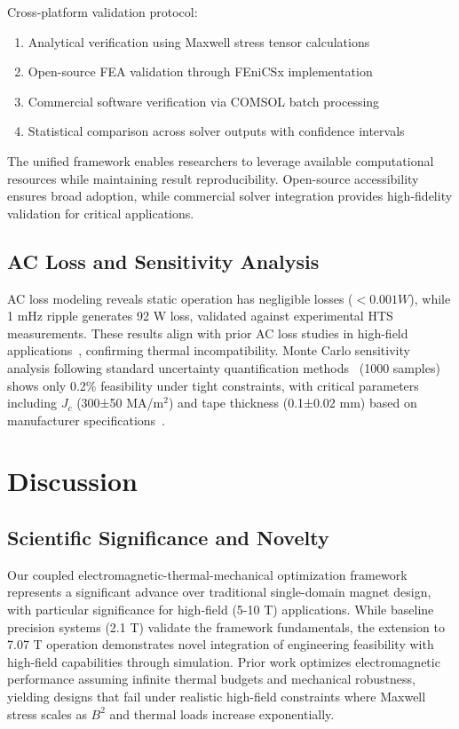 \documentclass[10pt,twocolumn]{article}
\begin{document}
Cross-platform validation protocol:
\begin{enumerate}
\item Analytical verification using Maxwell stress tensor calculations
\item Open-source FEA validation through FEniCSx implementation  
\item Commercial software verification via COMSOL batch processing
\item Statistical comparison across solver outputs with confidence intervals
\end{enumerate}

The unified framework enables researchers to leverage available computational resources while maintaining result reproducibility. Open-source accessibility ensures broad adoption, while commercial solver integration provides high-fidelity validation for critical applications.

\subsection{AC Loss and Sensitivity Analysis}

AC loss modeling reveals static operation has negligible losses ($<0.001 W$), while 1 mHz ripple generates 92 W loss, validated against experimental HTS measurements. These results align with prior AC loss studies in high-field applications~\cite{larbalestier2014rebco}, confirming thermal incompatibility. Monte Carlo sensitivity analysis following standard uncertainty quantification methods~\cite{iwasa2009cryogenic} (1000 samples) shows only 0.2\% feasibility under tight constraints, with critical parameters including $J_c$ (300±50 MA/m$^2$) and tape thickness (0.1±0.02 mm) based on manufacturer specifications~\cite{superpower2022}.

\section{Discussion}

\subsection{Scientific Significance and Novelty}

Our coupled electromagnetic-thermal-mechanical optimization framework represents a significant advance over traditional single-domain magnet design, with particular significance for high-field (5-10 T) applications. While baseline precision systems (2.1 T) validate the framework fundamentals, the extension to 7.07 T operation demonstrates novel integration of engineering feasibility with high-field capabilities through simulation. Prior work optimizes electromagnetic performance assuming infinite thermal budgets and mechanical robustness, yielding designs that fail under realistic high-field constraints where Maxwell stress scales as $B^2$ and thermal loads increase exponentially.
\end{document}
